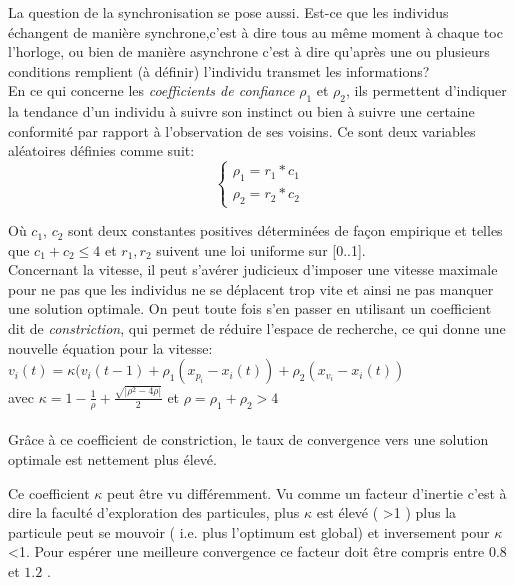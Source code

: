 \documentclass[12pt]{article}
\begin{document}
    \indent La question de la synchronisation se pose aussi. Est-ce que les individus échangent de manière synchrone,c'est à dire tous au même moment à chaque toc l'horloge, ou bien de manière asynchrone c'est à dire qu'après une ou plusieurs conditions remplient (à définir)  l'individu transmet les informations? \\
    \indent En ce qui concerne les \textit{coefficients de confiance} $\rho_{1}$ et $\rho_{2}$, ils permettent d'indiquer la tendance d'un individu à suivre son instinct ou bien à suivre une certaine conformité par rapport à l'observation de ses voisins. Ce sont deux variables aléatoires définies comme suit:
   \[
    \left\{\begin{array}{cc}
      \rho_{1} = r_{1}*c_{1} \\
      \rho_{2} = r_{2}*c_{2} 
    \end{array}
    \right.
  \]
    
Où $c_{1}$, $c_{2}$  sont deux constantes positives déterminées de façon empirique et telles que $c_{1} + c_{2} \le 4 $ et $r_{1}, r_{2}$ suivent une loi uniforme sur [0..1]. \\

Concernant la vitesse, il peut s'avérer judicieux d'imposer une vitesse maximale  pour ne pas que les individus ne se déplacent trop vite et ainsi ne pas manquer une solution optimale. On peut toute fois s'en passer en utilisant un coefficient dit de \textit{constriction}, qui permet de réduire l'espace de recherche, ce qui donne une nouvelle équation pour la vitesse: \\

$ v_{i}(t) = \kappa (v_{i}(t-1) + \rho_{1} (x_{p_{i}} - x_{i}(t)) + \rho_{2} (x_{v_{i}} - x_{i}(t))$ \\

avec $ \kappa = 1 - \frac{1}{\rho} + \frac{\sqrt{ |\rho^2 - 4\rho|}}{2} $
    et $\rho = \rho_{1} + \rho_{2} > 4$ \\ \\
    
    Grâce à ce coefficient de constriction, le taux de convergence vers une solution optimale est nettement plus élevé.
    
    Ce coefficient $\kappa$ peut être vu différemment. Vu comme un facteur d'inertie c'est à dire la faculté d'exploration des particules, plus $\kappa$ est élevé ( >1 ) plus la particule peut se mouvoir ( i.e. plus l'optimum est global) et inversement pour $\kappa$ <1. Pour espérer une meilleure convergence ce facteur doit être compris entre $0.8$ et $1.2$ .\\
    
\end{document}
